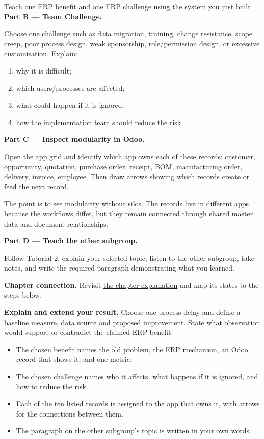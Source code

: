 \begin{labproject}{Teach one ERP benefit and one ERP challenge using the system you just built}
\medskip\noindent\textbf{Part B --- Team Challenge.}

Choose one challenge such as data migration, training, change resistance, scope creep, poor process design, weak sponsorship, role/permission design, or excessive customisation. Explain:
\begin{enumerate}
  \item why it is difficult;
  \item which users/processes are affected;
  \item what could happen if it is ignored;
  \item how the implementation team should reduce the risk.
\end{enumerate}

\medskip\noindent\textbf{Part C --- Inspect modularity in Odoo.}

Open the app grid and identify which app owns each of these records: customer, opportunity, quotation, purchase order, receipt, BOM, manufacturing order, delivery, invoice, employee. Then draw arrows showing which records create or feed the next record.

\begin{keyidea}
The point is to see modularity without silos. The records live in different apps because the workflows differ, but they remain connected through shared master data and document relationships.
\end{keyidea}

\medskip\noindent\textbf{Part D --- Teach the other subgroup.}

Follow Tutorial 2: explain your selected topic, listen to the other subgroup, take notes, and write the required paragraph demonstrating what you learned.
\end{labproject}

\textbf{Chapter connection.} Revisit \hyperref[ch:erp-development]{the chapter explanation} and map its states to the steps below.




\begin{verification}
\textbf{Explain and extend your result.} Choose one process delay and define a baseline measure, data source and proposed improvement. State what observation would support or contradict the claimed ERP benefit.


\begin{itemize}
  \item The chosen benefit names the old problem, the ERP mechanism, an Odoo record that shows it, and one metric.
  \item The chosen challenge names who it affects, what happens if it is ignored, and how to reduce the risk.
  \item Each of the ten listed records is assigned to the app that owns it, with arrows for the connections between them.
  \item The paragraph on the other subgroup's topic is written in your own words.
\end{itemize}
\end{verification}
